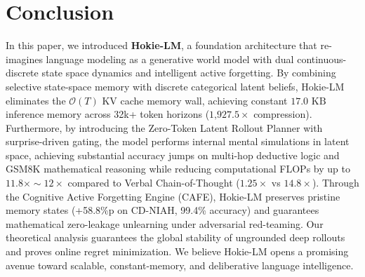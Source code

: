 \section{Conclusion}
\label{sec:conclusion}

In this paper, we introduced \textbf{Hokie-LM}, a foundation architecture that re-imagines language modeling as a generative world model with dual continuous-discrete state space dynamics and intelligent active forgetting.
By combining selective state-space memory with discrete categorical latent beliefs, Hokie-LM eliminates the $\mathcal{O}(T)$ KV cache memory wall, achieving constant $17.0\text{ KB}$ inference memory across 32k+ token horizons ($1\text{,}927.5\times$ compression).
Furthermore, by introducing the Zero-Token Latent Rollout Planner with surprise-driven gating, the model performs internal mental simulations in latent space, achieving substantial accuracy jumps on multi-hop deductive logic and GSM8K mathematical reasoning while reducing computational FLOPs by up to $11.8\times \sim 12\times$ compared to Verbal Chain-of-Thought ($1.25\times$ vs $14.8\times$).
Through the Cognitive Active Forgetting Engine (CAFE), Hokie-LM preserves pristine memory states (+58.8\%p on CD-NIAH, 99.4\% accuracy) and guarantees mathematical zero-leakage unlearning under adversarial red-teaming.
Our theoretical analysis guarantees the global stability of ungrounded deep rollouts and proves online regret minimization.
We believe Hokie-LM opens a promising avenue toward scalable, constant-memory, and deliberative language intelligence.
